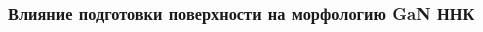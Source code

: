 \begin{frame}[c]
\begin{minipage}[t]{1\linewidth}
\begin{columns}[onlytextwidth]
\begin{column}{0.4\textwidth}
\begin{minipage}[t]{0.45\linewidth}
			\end{minipage}
		\end{column}
		\begin{column}{0.55\textwidth}
			\centering
			\\[5pt]
			\begin{minipage}[t]{0.3\linewidth}
			\end{minipage}
			\begin{minipage}[t]{0.3\linewidth}
			\end{minipage}
			\begin{minipage}[t]{0.3\linewidth}
			\end{minipage}
		\end{column}
	\end{columns}
\end{minipage}
\end{frame}

\begin{frame}
	\frametitle{Влияние подготовки поверхности на морфологию GaN ННК}
	\centering
	\begin{minipage}[t]{0.31\linewidth}
	\end{minipage}
	\\
	\bigskip
	\begin{minipage}[t]{0.31\linewidth}
	\end{minipage}
	\begin{minipage}[t]{0.31\linewidth}
	\end{minipage}
	\begin{minipage}[t]{0.31\linewidth}
	\end{minipage}
	\\
	\bigskip
	\begin{minipage}[t]{0.31\linewidth}
	\end{minipage}
	\begin{minipage}[t]{0.31\linewidth}
	\end{minipage}
	\begin{minipage}[t]{0.31\linewidth}
	\end{minipage}
\end{frame}

